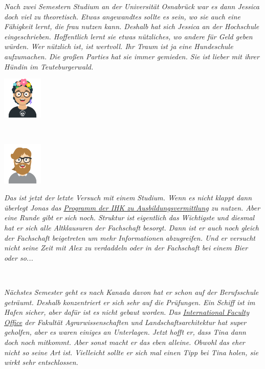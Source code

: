 \documentclass[a4paper, 9pt]{scrartcl}\usepackage[]{graphicx}\usepackage[]{xcolor}
\begin{document}
\begin{minipage}[c]{0.875\textwidth}
\textit{Nach zwei Semestern Studium an der Universität Osnabrück war es dann Jessica doch viel zu theoretisch. Etwas angewandtes sollte es sein, wo sie auch eine Fähigkeit lernt, die frau nutzen kann. Deshalb hat sich Jessica an der Hochschule eingeschrieben. Hoffentlich lernt sie etwas nützliches, wo andere für Geld geben würden. Wer nützlich ist, ist wertvoll. Ihr Traum ist ja eine Hundeschule aufzumachen. Die großen Parties hat sie immer gemieden. Sie ist lieber mit ihrer Hündin im Teuteburgerwald.}
\end{minipage}
\begin{minipage}[c]{0.125\textwidth}
\includegraphics[width = 1.9cm]{avatare/Jessica}
\end{minipage}\\[2.75Ex]
\begin{minipage}[c]{0.125\textwidth}
\includegraphics[width = 1.9cm]{avatare/Jonas}
\end{minipage}
\begin{minipage}[c]{0.875\textwidth}
\textit{Das ist jetzt der letzte Versuch mit einem Studium. Wenn es nicht klappt dann überlegt Jonas das \href{https://www.ihk.de/osnabrueck/aus-und-weiterbildung/ausbildung/ausbildungsbetriebe/projekt-neustart-1087206}{Programm der IHK zu Ausbildungsvermittlung} zu nutzen. Aber eine Runde gibt er sich noch. Struktur ist eigentlich das Wichtigste und diesmal hat er sich alle Altklausuren der Fachschaft besorgt. Dann ist er auch noch gleich der Fachschaft beigetreten um mehr Informationen abzugreifen. Und er versucht nicht seine Zeit mit Alex zu verdaddeln oder in der Fachschaft bei einem Bier oder so...}
\end{minipage}\\[2.75Ex]
\begin{minipage}[c]{0.875\textwidth}
\textit{Nächstes Semester geht es nach Kanada davon hat er schon auf der Berufsschule geträumt. Deshalb konzentriert er sich sehr auf die Prüfungen. Ein Schiff ist im Hafen sicher, aber dafür ist es nicht gebaut worden. Das \href{https://www.hs-osnabrueck.de/wir/fakultaeten/aul/international/}{International Faculty Office} der Fakultät Agrarwissenschaften und Landschaftsarchitektur hat super geholfen, aber es waren einiges an Unterlagen. Jetzt hofft er, dass Tina dann doch noch mitkommt. Aber sonst macht er das eben alleine. Obwohl das eher nicht so seine Art ist. Vielleicht sollte er sich mal einen Tipp bei Tina holen, sie wirkt sehr entschlossen.} 
\end{minipage}
\end{document}
